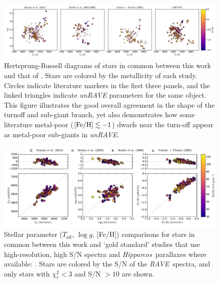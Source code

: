 \documentclass[preprint,trackchanges]{aastex}
\newcommand{\acronym}[1]{{\small{#1}}}
\newcommand{\project}[1]{\textsl{#1}}
\newcommand{\rave}{\project{\acronym{RAVE}}}
\newcommand{\hipparcos}{\project{Hipparcos}}
\newcommand{\teff}{T_{\mathrm{eff}}}
\newcommand{\logg}{\log g}
\begin{document}
\begin{figure}[p]
\includegraphics[width=\textwidth]{figures/gold-standard-hrd.pdf}
\caption{Hertsprung-Russell diagrams of stars in common between this work and that of \citet{Bensby_2014,Reddy_2003,Reddy_2006,Valenti_Fischer_2005}.  Stars are colored by the metallicity of each study. Circles indicate literature markers in the first three panels, and the linked triangles indicate \project{unRAVE} parameters for the same object. This figure illustrates the good overall agreement in the shape of the turnoff and sub-giant branch, yet also demonstrates how some literature metal-poor ($[{\rm Fe/H}] \lesssim -1$) dwarfs near the turn-off appear as metal-poor sub-giants in \project{unRAVE}.\label{fig:gold-standard-hrd}}
\end{figure}


\begin{figure}[p]
\includegraphics[width=\textwidth]{figures/gold-standard-comparison.pdf}
\caption{Stellar parameter ($\teff$, $\logg$, [Fe/H]) comparisons for stars in common between this work and `gold standard' studies that use high-resolution, high S/N spectra and \hipparcos\ parallaxes where available: \citet{Bensby_2014,Reddy_2003,Reddy_2006,Valenti_Fischer_2005}. Stars are colored by the S/N of the \rave\ spectra, and only stars with $\chi_r^2 < 3$ and S/N $> 10$ are shown.  \label{fig:gold-standard-comparison}}
\end{figure}
\end{document}
